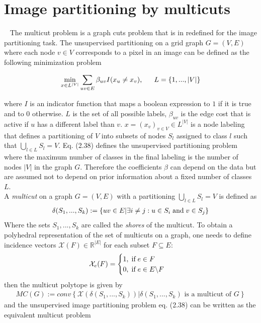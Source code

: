 \section{Image partitioning by multicuts}~\label{sec:multicut}
The multicut problem is a graph cuts problem that is in \cite{10.1007/978-3-642-23094-3_3} redefined for the image partitioning task. The unsupervised partitioning on a grid graph $G=(V, E)$ where each node $v \in V$ corresponds to a pixel in an image can be defined as the following minimization problem

\begin{align}
	\min_{x \in L^{|V|}} \sum_{uv \in E} \beta_{uv} I(x_u \neq x_v) \text{, \hspace{5mm}} L=\{ 1, ..., |V| \}
\end{align}

where $I$ is an indicator function that maps a boolean expression to $1$ if it is true and to $0$ otherwise. $L$ is the set of all possible labels, $\beta_{uv}$ is the edge cost that is active if $u$ has a different label than $v$. $x=(x_v)_{v\in V} \in L^{|V|}$ is a node labeling that defines a partitioning of $V$ into subsets of nodes $S_l$ assigned to class $l$ such that $\bigcup_{l \in L} S_l = V$. Eq. (2.38) defines the unsupervised partitioning problem where the maximum number of classes in the final labeling is the number of nodes $|V|$ in the graph $G$. Therefore the coefficients $\beta$ can depend on the data but are assumed not to depend on prior information about a fixed number of classes $L$. \\
A \emph{multicut} on a graph $G=(V,E)$ with a partitioning $\bigcup_{l \in L} S_l = V$ is defined as 
\begin{align}
	\delta(S_1, ..., S_k) := \left\{ uv \in E | \exists i \neq j : u \in S_i \text{\hspace{1mm}and\hspace{1mm}} v \in S_j \right\}
\end{align}
Where the sets $S_1, ..., S_k$ are called the \emph{shores} of the multicut.
To obtain a polyhedral representation of the set of multicuts on a graph, one needs to define incidence vectors $\mathcal{X}(F) \in \mathbb{R}^{|E|}$ for each subset $F \subseteq E$:
\begin{align}
	\mathcal{X}_e(F) = \begin{cases}
	1, \text{\hspace{1mm}if\hspace{1mm}} e \in F \\
	0, \text{\hspace{1mm}if\hspace{1mm}} e \in E \backslash F
	\end{cases}
\end{align}
then the multicut polytope is given by
\begin{align}
	MC(G) := conv\left\{ \mathcal{X}(\delta (S_1, ..., S_k)) | \delta (S_1, ..., S_k) \text{ is a multicut of } G \right\}
\end{align}
and the unsupervised image partitioning problem eq. (2.38) can be written as the equivalent multicut problem

